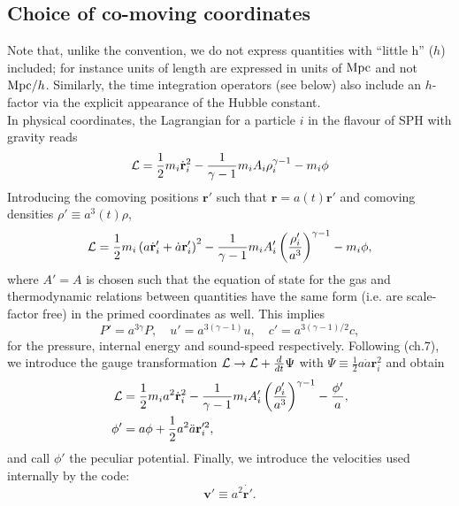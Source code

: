 \subsection{Choice of co-moving coordinates}
\label{ssec:ccordinates}

Note that, unlike the \gadget convention, we do not express quantities with
``little h'' ($h$) included; for instance units of length are expressed in
units of $\rm{Mpc}$ and not ${\rm{Mpc}}/h$. Similarly, the time integration
operators (see below) also include an $h$-factor via the explicit appearance of
the Hubble constant.\\
In physical coordinates, the Lagrangian for a particle $i$ in the
\cite{Springel2002} flavour of SPH with gravity reads
\begin{equation}
  \mathcal{L} =
  \frac{1}{2} m_i \dot{\mathbf{r}}_i^2 -
  \frac{1}{\gamma-1}m_iA_i\rho_i^{\gamma-1} -
  m_i \phi
\end{equation}
Introducing the comoving positions $\mathbf{r}'$ such that $\mathbf{r}
= a(t) \mathbf{r}'$ and comoving densities $\rho' \equiv a^3(t)\rho$,
\begin{equation}
  \mathcal{L} =
  \frac{1}{2} m_i \left(a\dot{\mathbf{r}}_i' + \dot{a}\mathbf{r}_i'
  \right)^2 - 
  \frac{1}{\gamma-1}m_iA_i'\left(\frac{\rho_i'}{a^3}\right)^{\gamma-1}
  - m_i \phi,
\end{equation}
where $A'=A$ is chosen such that the equation of state for
the gas and thermodynamic relations between quantities have the same
form (i.e. are scale-factor free) in the primed coordinates as
well. This implies
\begin{equation}
  P' = a^{3\gamma}P,\quad u'=a^{3(\gamma-1)}u, \quad c'=a^{3(\gamma-1)/2}c,
\end{equation}
for the pressure, internal energy and sound-speed
respectively. Following \cite{Peebles1980} (ch.7), we introduce the
gauge transformation $\mathcal{L} \rightarrow \mathcal{L} + \frac{d}{dt}\Psi$ with
$\Psi \equiv \frac{1}{2}a\dot{a}\mathbf{r}_i^2$ and obtain
\begin{align}
  \mathcal{L} &= \frac{1}{2}m_ia^2 \dot{\mathbf{r}}_i^2 -
  \frac{1}{\gamma-1}m_iA_i'\left(\frac{\rho_i'}{a^3}\right)^{\gamma-1}
  -\frac{\phi'}{a},\\
  \phi' &= a\phi + \frac{1}{2}a^2\ddot{a}\mathbf{r}_i'^2,\nonumber
\end{align}
and call $\phi'$ the peculiar potential.  Finally, we introduce the
velocities used internally by the code:
\begin{equation}
  \mathbf{v}' \equiv a^2\dot{\mathbf{r}'}.
\end{equation}
